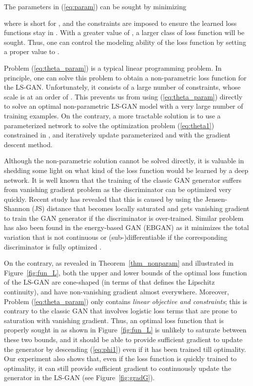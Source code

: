 \documentclass[11pt,fullpage, letterpaper,twoside]{article}
\newcommand{\1}[1]{\mathds{1}_{\left[#1\right]}}
\begin{document}
The parameters  in (\ref{eq:param}) can be sought by minimizing

where  is short for , and the constraints are imposed to ensure the learned loss functions stay in .
With a greater value of , a larger class of loss function will be sought.  Thus, one can control the modeling ability of the loss function by setting a proper value to .

Problem (\ref{eq:theta_param}) is a typical linear programming problem. In principle, one can solve this problem to obtain a non-parametric loss function for the LS-GAN.
Unfortunately, it consists of a large number of constraints, whose scale is at an order of . This prevents us from using (\ref{eq:theta_param}) directly to solve an optimal non-parametric LS-GAN model with a very large number of training examples.
On the contrary, a more tractable solution is to use a parameterized network to solve the optimization problem (\ref{eq:theta1}) constrained in , and iteratively update parameterized  and  with the gradient descent method.


Although the non-parametric solution cannot be solved directly, it is valuable in shedding some light on what kind of the loss function would be learned by a deep network. It is well known that the training of the classic GAN generator suffers from vanishing gradient problem as the discriminator can be optimized very quickly.  Recent study \cite{wgan17} has revealed that this is caused by using the Jensen-Shannon (JS) distance that becomes locally saturated and gets vanishing gradient to train the GAN generator if the discriminator is over-trained. Similar problem has also been found in the energy-based GAN (EBGAN) \cite{zhao2016energy} as it minimizes the total variation that is not continuous or (sub-)differentiable if the corresponding discriminator is fully optimized \cite{wgan17}.

On the contrary, as revealed in Theorem~\ref{thm_nonparam} and illustrated in Figure~\ref{fig:fun_L}, both the upper and lower bounds of the optimal loss function of the LS-GAN are cone-shaped (in terms of  that defines the Lipschitz continuity), and have non-vanishing gradient almost everywhere. Moreover, Problem (\ref{eq:theta_param}) only contains {\em linear objective and constraints}; this is contrary to the classic GAN that involves logistic loss terms that are prone to saturation with vanishing gradient. Thus, an optimal loss function that is properly sought in  as shown in Figure~\ref{fig:fun_L} is unlikely to saturate between these two bounds, and it should be able to provide sufficient gradient to update the generator by descending (\ref{eq:phi1}) even if it has been trained till optimality. Our experiment also shows that, even if the loss function is quickly trained to optimality, it can still provide sufficient gradient to continuously update the generator in the LS-GAN (see Figure~\ref{fig:gradG}).
\end{document}
